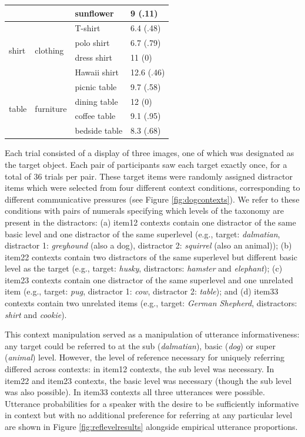 \documentclass[11pt]{article}
\newcommand{\figref}[1]{Figure \ref{#1}}
\begin{document}
\begin{table}
\begin{tabular}{l l l l}
		& & sunflower & 9 (.11)\\
	\midrule
	\multirow{4}{*}{shirt} & \multirow{4}{*}{clothing} & T-shirt & 6.4 (.48)\\
		& & polo shirt & 6.7 (.79)\\
		& & dress shirt & 11 (0)\\
		& & Hawaii shirt & 12.6 (.46)\\
	\midrule
	\multirow{4}{*}{table} & \multirow{4}{*}{furniture} & picnic table & 9.7 (.58)\\
		& & dining table & 12 (0)\\
		& & coffee table & 9.1 (.95)\\
		& & bedside table & 8.3 (.68)\\				
	\bottomrule
	\end{tabular}
\end{table}
Each trial consisted of a display of three images, one of which was designated as the target object. Each pair of participants saw each target exactly once, for a total of 36 trials per pair. These target items were randomly assigned distractor items which were selected from four different context conditions, corresponding to different communicative pressures (see \figref{fig:dogcontexts}). We refer to these conditions with pairs of numerals specifying which levels of the taxonomy are present in the distractors: (a) item12 contexts contain one distractor of the same basic level and one distractor of the same superlevel (e.g., target: \emph{dalmatian}, distractor 1: \emph{greyhound} (also a dog), distractor 2: \emph{squirrel} (also an animal)); (b) item22 contexts contain two distractors of the same superlevel but different basic level as the target (e.g., target: \emph{husky}, distractors: \emph{hamster} and \emph{elephant}); (c) item23 contexts contain one distractor of the same superlevel and one unrelated item (e.g., target: \emph{pug}, distractor 1: \emph{cow}, distractor 2: \emph{table}); and (d) item33 contexts contain two unrelated items (e.g., target: \emph{German Shepherd}, distractors: \emph{shirt} and \emph{cookie}). 

This context manipulation served as a manipulation of utterance informativeness: any target could be referred to at the sub (\emph{dalmatian}), basic (\emph{dog}) or super (\emph{animal}) level. However, the level of reference necessary for uniquely referring differed across contexts: in item12 contexts, the sub level was necessary. In item22 and item23 contexts, the basic level was necessary (though the sub level was also possible). In item33 contexts all three utterances were possible. Utterance probabilities for a speaker with the desire to be sufficiently informative in context but with no additional preference for referring at any particular level are shown in \figref{fig:reflevelresults} alongside empirical utterance proportions.
\end{document}
